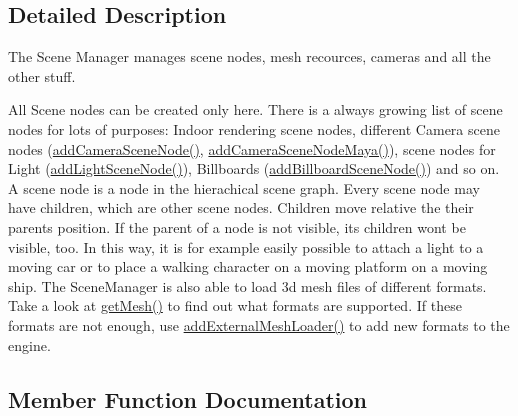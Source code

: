 \subsection{Detailed Description}
The Scene Manager manages scene nodes, mesh recources, cameras and all the other stuff. 

All Scene nodes can be created only here. There is a always growing list of scene nodes for lots of purposes\+: Indoor rendering scene nodes, different Camera scene nodes (\hyperlink{classirr_1_1scene_1_1ISceneManager_a6d8f9930cfbd4469ebfd798ba1e65db8}{add\+Camera\+Scene\+Node()}, \hyperlink{classirr_1_1scene_1_1ISceneManager_adc6cafb1f284dea325e9511917cb1f14}{add\+Camera\+Scene\+Node\+Maya()}), scene nodes for Light (\hyperlink{classirr_1_1scene_1_1ISceneManager_ac832789009b7670a90eb0e3250397a83}{add\+Light\+Scene\+Node()}), Billboards (\hyperlink{classirr_1_1scene_1_1ISceneManager_a580bb5e0db1043e9c57874b87a7d3b8a}{add\+Billboard\+Scene\+Node()}) and so on. A scene node is a node in the hierachical scene graph. Every scene node may have children, which are other scene nodes. Children move relative the their parents position. If the parent of a node is not visible, its children won\textquotesingle{}t be visible, too. In this way, it is for example easily possible to attach a light to a moving car or to place a walking character on a moving platform on a moving ship. The Scene\+Manager is also able to load 3d mesh files of different formats. Take a look at \hyperlink{classirr_1_1scene_1_1ISceneManager_aca1b12117220849983243ee2f73a8f4d}{get\+Mesh()} to find out what formats are supported. If these formats are not enough, use \hyperlink{classirr_1_1scene_1_1ISceneManager_a808972cc001db86c0576c38b3b3fbbf7}{add\+External\+Mesh\+Loader()} to add new formats to the engine. 

\subsection{Member Function Documentation}
